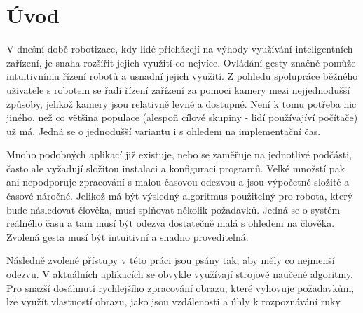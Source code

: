 \chapter{Úvod}
V dnešní době robotizace, kdy lidé přicházejí na výhody využívání inteligentních zařízení, je snaha rozšířit jejich využití co nejvíce. Ovládání gesty značně pomůže intuitivnímu řízení robotů a usnadní jejich využití.
Z pohledu spolupráce běžného uživatele s robotem se řadí řízení zařízení za pomoci kamery mezi nejjednodušší způsoby, jelikož kamery jsou relativně levné a dostupné. Není k tomu potřeba nic jiného, než co většina populace (alespoň cílové skupiny - lidí používajíví počítače) už má. Jedná se o jednodušší variantu i s ohledem na implementační čas.

Mnoho podobných aplikací již existuje, nebo se zaměřuje na jednotlivé podčásti, často ale vyžadují složitou instalaci a konfiguraci programů. Velké množstí pak ani nepodporuje zpracování s malou časovou odezvou a jsou výpočetně složité a časové náročné.
Jelikož má být výsledný algoritmus použitelný pro robota, který  bude  následovat člověka, musí splňovat několik požadavků. Jedná se o systém reálného času a tam musí být odezva dostatečně malá s ohledem na člověka. Zvolená gesta musí být intuitivní a snadno proveditelná. 		%

Následně zvolené přístupy v této práci jsou psány tak, aby měly co nejmenší odezvu. 
V aktuálních aplikacích se obvykle využívají strojově naučené algoritmy. Pro snazší dosáhnutí rychlejšího zpracování obrazu, které vyhovuje požadavkům, lze využít vlastností obrazu, jako jsou vzdálenosti a úhly k rozpoznávání ruky.



\endinput